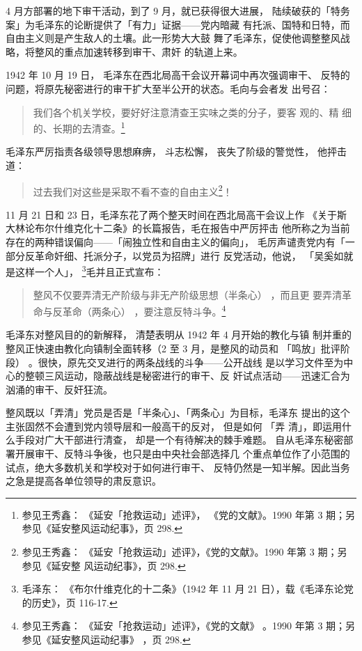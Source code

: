 4 月方部署的地下审干活动，到了 9 月，就已获得很大进展，
陆续破获的「特务案」为毛泽东的论断提供了「有力」证据——党内暗藏
有托派、国特和日特，而自由主义则是产生敌人的土壤。此一形势大大鼓
舞了毛泽东，促使他调整整风战略，将整风的重点加速转移到审干、肃奸
的轨道上来。

1942 年 10 月 19 日，
毛泽东在西北局高干会议开幕词中再次强调审干、
反特的问题，将原先秘密进行的审干扩大至半公开的状态。毛向与会者发
出号召：
\begin{quote}
{\fzwkai 我们各个机关学校，要好好注意清查王实味之类的分子，要客 观的、精
细的、长期的去清查。\footnote{参见王秀鑫： 《延安「抢救运动」述评》，
《党的文献》。1990 年第 3 期；另参见《延安整风运动纪事》，页 298.}} 
\end{quote}

毛泽东严厉指责各级领导思想麻痹，
斗志松懈，
丧失了阶级的警觉性，
他抨击道：
\begin{quote}
{\fzwkai 过去我们对这些是采取不看不查的自由主义\footnote{参见王秀鑫：
《延安「抢救运动」述评》，《党的文献》。1990 年第 3 期；另参见《延安整
风运动纪事》，页 298.  }！} 
\end{quote}

11 月 21 日和 23 日，毛泽东花了两个整天时间在西北局高干会议上作 《关于斯
大林论布尔什维克化十二条》的长篇报告，毛在报告中严厉抨击 他所称之为当前
存在的两种错误偏向——「闹独立性和自由主义的偏向」， 毛厉声谴责党内有「一
部分反革命奸细、托派分子，以党员为招牌」进行 反党活动，他说， 「吴奚如就
是这样一个人」， \footnote{毛泽东： 《布尔什维克化的十二条》（1942 年
11 月 21 日），载《毛泽东论党的历史》，页 116-17.}毛并且正式宣布：
\begin{quote}
{\fzwkai 整风不仅要弄清无产阶级与非无产阶级思想（半条心）
，而且更
要弄清革命与反革命（两条心）
，要注意反特斗争。\footnote{参见王秀鑫：
《延安「抢救运动」述评》，《党的文献》
。1990 年第 3 期；另参见《延安整风运动纪事》
，页 298. }} 
\end{quote}

毛泽东对整风目的的新解释，
清楚表明从 1942 年 4 月开始的教化与镇
制并重的整风正快速由教化向镇制全面转移（2 至 3 月，是整风的动员和
「鸣放」批评阶段）
。很快，原先交叉进行的两条战线的斗争——公开战线
是以学习文件至为中心的整顿三风运动，隐蔽战线是秘密进行的审干、反
奸试点活动——迅速汇合为汹涌的审干、反奸狂流。

整风既以「弄清」党员是否是「半条心」、「两条心」为目标，毛泽东
提出的这个主张固然不会遭到党内领导层和一般高干的反对，
但是如何
「弄
清」，即运用什么手段对广大干部进行清查，
却是一个有待解决的棘手难题。
自从毛泽东秘密部署开展审干、反特斗争後，也只是由中央社会部选择几
个重点单位作了小范围的试点，绝大多数机关和学校对于如何进行审干、
反特仍然是一知半解。因此当务之急是提高各单位领导的肃反意识。

